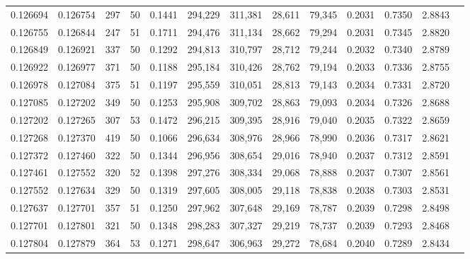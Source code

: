 \begin{tabular}{rrrrrrrrrrrrr}
0.126694 & 0.126754 &   297 &  50 &                                     0.1441 & 294,229 & 311,381 &  28,611 &  79,345 & 0.2031 & 0.7350 & 2.8843 \\
0.126755 & 0.126844 &   247 &  51 &                                     0.1711 & 294,476 & 311,134 &  28,662 &  79,294 & 0.2031 & 0.7345 & 2.8820 \\
0.126849 & 0.126921 &   337 &  50 &                                     0.1292 & 294,813 & 310,797 &  28,712 &  79,244 & 0.2032 & 0.7340 & 2.8789 \\
0.126922 & 0.126977 &   371 &  50 &                                     0.1188 & 295,184 & 310,426 &  28,762 &  79,194 & 0.2033 & 0.7336 & 2.8755 \\
0.126978 & 0.127084 &   375 &  51 &                                     0.1197 & 295,559 & 310,051 &  28,813 &  79,143 & 0.2034 & 0.7331 & 2.8720 \\
0.127085 & 0.127202 &   349 &  50 &                                     0.1253 & 295,908 & 309,702 &  28,863 &  79,093 & 0.2034 & 0.7326 & 2.8688 \\
0.127202 & 0.127265 &   307 &  53 &                                     0.1472 & 296,215 & 309,395 &  28,916 &  79,040 & 0.2035 & 0.7322 & 2.8659 \\
0.127268 & 0.127370 &   419 &  50 &                                     0.1066 & 296,634 & 308,976 &  28,966 &  78,990 & 0.2036 & 0.7317 & 2.8621 \\
0.127372 & 0.127460 &   322 &  50 &                                     0.1344 & 296,956 & 308,654 &  29,016 &  78,940 & 0.2037 & 0.7312 & 2.8591 \\
0.127461 & 0.127552 &   320 &  52 &                                     0.1398 & 297,276 & 308,334 &  29,068 &  78,888 & 0.2037 & 0.7307 & 2.8561 \\
0.127552 & 0.127634 &   329 &  50 &                                     0.1319 & 297,605 & 308,005 &  29,118 &  78,838 & 0.2038 & 0.7303 & 2.8531 \\
0.127637 & 0.127701 &   357 &  51 &                                     0.1250 & 297,962 & 307,648 &  29,169 &  78,787 & 0.2039 & 0.7298 & 2.8498 \\
0.127701 & 0.127801 &   321 &  50 &                                     0.1348 & 298,283 & 307,327 &  29,219 &  78,737 & 0.2039 & 0.7293 & 2.8468 \\
0.127804 & 0.127879 &   364 &  53 &                                     0.1271 & 298,647 & 306,963 &  29,272 &  78,684 & 0.2040 & 0.7289 & 2.8434 \\

\end{tabular}
